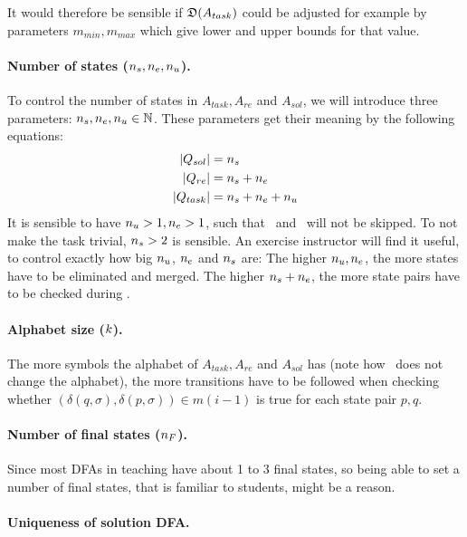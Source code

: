 It would therefore be sensible if $\mathfrak{D}(A_{task})$ could be adjusted for example by parameters $m_{min}, m_{max}$ which give lower and upper bounds for that value.

\paragraph*{Number of states \texorpdfstring{(${n_s}, {n_e}, {n_u}$)}{}.}

To control the number of states in $A_{task}, A_{re}$ and $A_{sol}$, we will introduce three parameters: ${n_s}, {n_e}, {n_u} \in \mathbb{N}$. These parameters get their meaning by the following equations:
\begin{align*}
    |Q_{sol}| &= {n_s} \\
    |Q_{re}| &= {n_s} + {n_e} \\
    |Q_{task}| &= {n_s} + {n_e} + {n_u}
\end{align*}
It is sensible to have ${n_u} > 1, {n_e} > 1$, such that \RemUnr\ and \RemEq\ will not be skipped. To not make the task trivial, ${n_s} > 2$ is sensible. An exercise instructor will find it useful, to control exactly how big ${n_u}$, ${n_e}$ and ${n_s}$ are: The higher ${n_u}, {n_e}$, the more states have to be eliminated and merged. The higher ${n_s} + {n_e}$, the more state pairs have to be checked during \CompDist.

\paragraph*{Alphabet size \texorpdfstring{($k$)}{}.}

The more symbols the alphabet of $A_{task}, A_{re}$ and $A_{sol}$ has (note how \MinAlg\ does not change the alphabet), the more transitions have to be followed when checking whether $(\delta(q,\sigma),\delta(p,\sigma))\in m(i-1)$ is true for each state pair $p,q$.

\paragraph*{Number of final states \texorpdfstring{(${n_F}$)}{}.}

Since most DFAs in teaching have about 1 to 3 final states, so being able to set a number of final states, that is familiar to students, might be a reason.

\paragraph*{Uniqueness of solution DFA.}

